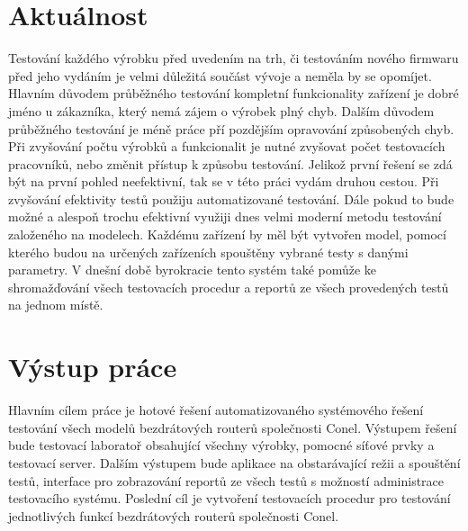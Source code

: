 \section{Aktuálnost}
Testování každého výrobku před uvedením na trh, či testováním nového firmwaru před jeho vydáním je velmi důležitá součást vývoje a neměla by se opomíjet. Hlavním důvodem průběžného testování kompletní funkcionality zařízení je dobré jméno u zákazníka, který nemá zájem o výrobek plný chyb. Dalším důvodem průběžného testování je méně práce pří pozdějším opravování způsobených chyb. Při zvyšování počtu výrobků a funkcionalit je nutné zvyšovat počet testovacích pracovníků, nebo změnit přístup k způsobu testování. Jelikož první řešení se zdá být na první pohled neefektivní, tak se v této práci vydám druhou cestou. Při zvyšování efektivity testů použiju automatizované testování. Dále pokud to bude možné a alespoň trochu efektivní využiji dnes velmi moderní metodu testování založeného na modelech. Každému zařízení by měl být vytvořen model, pomocí kterého budou na určených zařízeních spouštěny vybrané testy s danými parametry. V dnešní době byrokracie tento systém také pomůže ke shromažďování všech testovacích procedur a reportů ze všech provedených testů na jednom místě.

\section{Výstup práce}
Hlavním cílem práce je hotové řešení automatizovaného systémového řešení testování všech modelů bezdrátových routerů společnosti Conel. Výstupem  řešení bude testovací laboratoř obsahující všechny výrobky, pomocné síťové prvky a testovací server. Dalším výstupem bude aplikace na obstarávající režii a spouštění testů, interface pro zobrazování reportů ze všech testů s možností administrace testovacího systému. Poslední cíl je vytvoření testovacích procedur pro testování jednotlivých funkcí bezdrátových routerů společnosti Conel.

